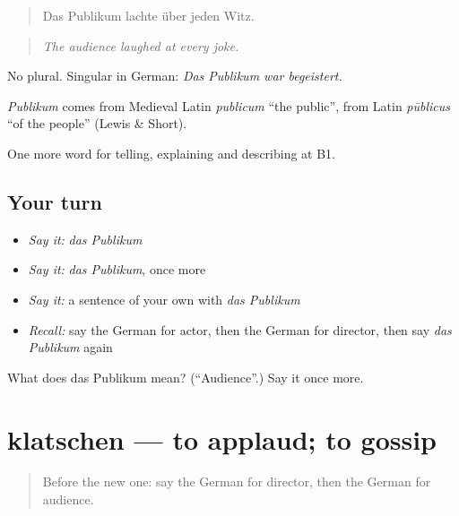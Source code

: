 \begin{quote}
Das Publikum lachte über jeden Witz.
\end{quote}

\begin{quote}
\emph{The audience laughed at every joke.}
\end{quote}

No plural. Singular in German: \emph{Das Publikum war begeistert.}

\begin{cousinweb}
\emph{Publikum} comes from Medieval Latin \emph{publicum} \textquotedblleft{}the public\textquotedblright{}, from Latin \emph{pūblicus} \textquotedblleft{}of the people\textquotedblright{} (Lewis \& Short).
\end{cousinweb}

\begin{grammarlens}[title={What you've built}]
One more word for telling, explaining and describing at B1.
\end{grammarlens}

\subsection*{Your turn}
\begin{itemize}
\raggedright
  \item \emph{Say it:} \emph{das Publikum}
  \item \emph{Say it:} \emph{das Publikum}, once more
  \item \emph{Say it:} a sentence of your own with \emph{das Publikum}
  \item \emph{Recall:} say the German for actor, then the German for director, then say \emph{das Publikum} again
\end{itemize}

\begin{tcolorbox}[breakable,colback=teal!4,colframe=teal!35!black,title={Before you move on}]
What does das Publikum mean? (\textquotedblleft{}Audience\textquotedblright{}.) Say it once more.
\end{tcolorbox}
\section[klatschen]{klatschen — to applaud; to gossip}

\label{lesson:GE-C517-klatschen}



\begin{quote}
Before the new one: say the German for director, then the German for audience.
\end{quote}

